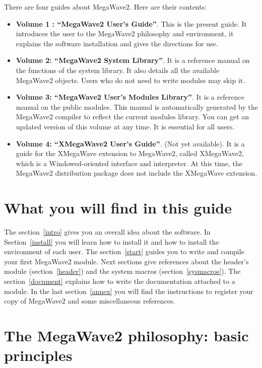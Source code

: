 There are four guides about MegaWave2. 
Here are their contents:

\begin{itemize}
\item {\bf Volume 1 : ``MegaWave2 User's Guide''}. 
This is the present guide.
It introduces the user to the MegaWave2 philosophy and environment, it explains
the software installation and gives the directions for use.
\item {\bf  Volume 2: ``MegaWave2 System Library''}.
It is a reference manual on the functions of the system library. 
It also details all the available MegaWave2 objects.
Users who do not need to write modules may skip it.
\item {\bf  Volume 3: ``MegaWave2 User's Modules Library''}.
It is a reference manual on the public modules.
This manual is automatically generated by the MegaWave2 compiler to reflect
the current modules library. 
You can get an updated version of this volume at any time.
It is essential for all users.
\item {\bf Volume 4: ``XMegaWave2 User's Guide''}.
(Not yet available).
It is a guide for the XMegaWave extension to MegaWave2, called XMegaWave2, which is a Windowed-oriented 
interface and interpreter. At this time, the MegaWave2 distribution package does not include the XMegaWave extension.
\end{itemize}

\section{What you will find in this guide}
\label{intro_guide}

The section~\ref{intro} gives you an overall idea about the software.
In Section~\ref{install} you will learn how to install it and how to install the environment of each user.
The section~\ref{start} guides you to write and compile your first MegaWave2 module.
Next sections give references about the header's module (section~\ref{header}) and the system macros (section~\ref{sysmacros}).
The section~\ref{document} explains how to write the documentation attached to  a module.
In the last section~\ref{annex} you will find the instructions to register your copy of MegaWave2 and some miscellaneous references.

\section{The MegaWave2 philosophy: basic principles}
\label{intro_philo}

